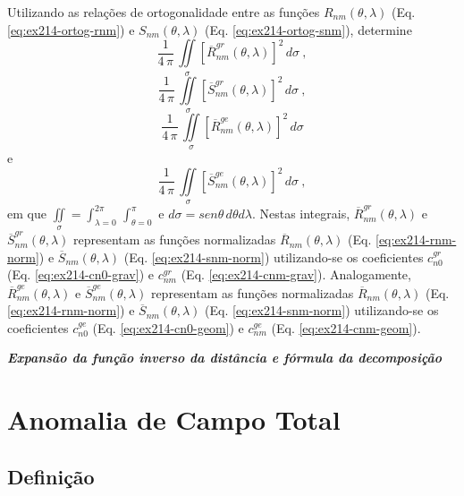 \documentclass[10pt,a4paper,fleqn]{article}
\begin{document}
Utilizando as relaç\~{o}es de ortogonalidade entre as funç\~{o}es $R_{nm}(\theta, \lambda)$ 
(Eq. \ref{eq:ex214-ortog-rnm}) e $S_{nm}(\theta, \lambda)$ (Eq. \ref{eq:ex214-ortog-snm}),
determine 
$$\dfrac{1}{4 \, \pi} \, \iint \limits_{\sigma} \left[ \overline{R}_{nm}^{gr} (\theta, \lambda)
\right]^{2} \, d \sigma \: ,$$ 
$$\dfrac{1}{4 \, \pi} \, \iint \limits_{\sigma} \left[ \overline{S}_{nm}^{gr} (\theta, \lambda)
\right]^{2} \, d \sigma \: ,$$ 
$$\dfrac{1}{4 \, \pi} \, \iint \limits_{\sigma} \left[ \overline{R}_{nm}^{ge} (\theta, \lambda)
\right]^{2} \, d \sigma$$ 
e
$$\dfrac{1}{4 \, \pi} \, \iint \limits_{\sigma} \left[ \overline{S}_{nm}^{ge}  (\theta, \lambda)
\right]^{2} \, d \sigma \: ,$$
em que $\iint \limits_{\sigma} = \int_{\lambda = 0}^{2\pi} \, \int_{\theta = 0}^{\pi}$ e $d \sigma 
= sen\theta \, d\theta d\lambda$. Nestas integrais, $\overline{R}_{nm}^{gr} (\theta, \lambda)$ e 
$\overline{S}_{nm}^{gr} (\theta, \lambda)$ representam as funç\~{o}es normalizadas $\overline{R}_{nm}
(\theta, \lambda)$ (Eq. \ref{eq:ex214-rnm-norm}) e $\overline{S}_{nm} (\theta, \lambda)$ 
(Eq. \ref{eq:ex214-snm-norm}) utilizando-se os coeficientes $c_{n0}^{gr}$ (Eq. \ref{eq:ex214-cn0-grav}) 
e $c_{nm}^{gr}$ (Eq. \ref{eq:ex214-cnm-grav}). Analogamente, $\overline{R}_{nm}^{ge} (\theta, \lambda)$ 
e $\overline{S}_{nm}^{ge} (\theta, \lambda)$ representam as funç\~{o}es normalizadas 
$\overline{R}_{nm} (\theta, \lambda)$ (Eq. \ref{eq:ex214-rnm-norm}) e $\overline{S}_{nm} (\theta, \lambda)$ 
(Eq. \ref{eq:ex214-snm-norm}) utilizando-se os coeficientes $c_{n0}^{ge}$ 
(Eq. \ref{eq:ex214-cn0-geom}) e $c_{nm}^{ge}$ (Eq. \ref{eq:ex214-cnm-geom}).

\begin{flushleft}
\dotfill
\end{flushleft}

\bigskip
\bigskip

\begin{flushleft}
\emph{\textbf{Expans\~{a}o da funç\~{a}o inverso da dist\^{a}ncia e f\'{o}rmula da decomposiç\~{a}o}}
\end{flushleft}

\bigskip
\bigskip

\section{Anomalia de Campo Total}

\subsection{Definiç\~{a}o}
\end{document}
